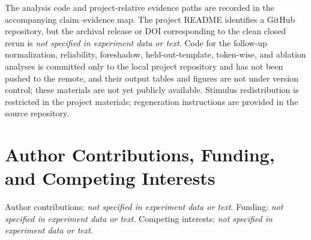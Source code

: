 \documentclass[11pt]{article}
\newcommand{\missinginfo}{\textit{not specified in experiment data or text}}
\begin{document}
The analysis code and project-relative evidence paths are recorded in the accompanying claim--evidence map.
The project README identifies a GitHub repository, but the archival release or DOI corresponding to the clean closed rerun is \missinginfo.
Code for the follow-up normalization, reliability, foreshadow, held-out-template, token-wise, and ablation analyses is committed only to the local project repository and has not been pushed to the remote, and their output tables and figures are not under version control; these materials are not yet publicly available.
Stimulus redistribution is restricted in the project materials; regeneration instructions are provided in the source repository.

\section*{Author Contributions, Funding, and Competing Interests}

Author contributions: \missinginfo.
Funding: \missinginfo.
Competing interests: \missinginfo.




\clearpage
\appendix

\end{document}
